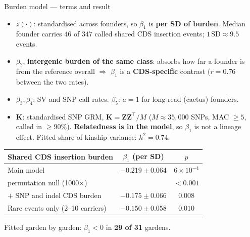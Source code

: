 \documentclass[aspectratio=169,11pt]{beamer}
\begin{document}
\begin{frame}[shrink]{Burden model --- terms and result}

\begin{itemize}\itemsep3pt
  \item $z(\cdot)$: standardised across founders, so $\beta_1$ is
        \textbf{per SD of burden}. Median founder carries $46$ of $347$ called
        shared CDS insertion events; $1\,\mathrm{SD}\approx 9.5$ events.
  \item $\beta_2$, \textbf{intergenic burden of the same class}: absorbs how far a
        founder is from the reference overall $\Rightarrow$ $\beta_1$ is a
        \textbf{CDS-specific} contrast ($r=0.76$ between the two rates).
  \item $\beta_3,\beta_4$: SV and SNP call rates. $\beta_5$: $a=1$ for long-read
        (cactus) founders.
  \item $\mathbf{K}$: standardised SNP GRM, $\mathbf{K}=\mathbf{Z}\mathbf{Z}^{\!\top}\!/M$
        ($M\approx35{,}000$ SNPs, MAC $\ge 5$, called in $\ge 90\%$).
        \textbf{Relatedness is in the model}, so $\beta_1$ is not a lineage effect.
        Fitted share of kinship variance: $h^2=0.74$.
\end{itemize}

\begin{center}
\begin{tabular}{lcc}
\toprule
Shared CDS insertion burden & $\beta_1$ (per SD) & $p$ \\
\midrule
Main model                            & $-0.219 \pm 0.064$ & $6\times10^{-4}$ \\
\quad permutation null (1000$\times$) &                    & $<0.001$ \\
$+$ SNP and indel CDS burden          & $-0.175 \pm 0.066$ & $0.008$ \\
Rare events only (2--10 carriers)     & $-0.150 \pm 0.058$ & $0.010$ \\
\bottomrule
\end{tabular}
\end{center}

\medskip
Fitted garden by garden: $\beta_1<0$ in \textbf{29 of 31} gardens.

\end{frame}
\end{document}
